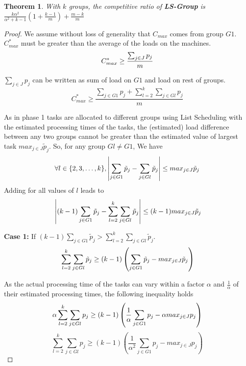 \documentclass[10pt, conference, compsocconf]{IEEEtran}
\newtheorem{theorem}{Theorem}
\begin{document}
\begin{theorem}
  \label{th:strategy3}
  With $k$ groups, the competitive ratio of
  \textbf{LS-Group } is $ \frac{k\alpha^{2}}{\alpha^{2}+k-1} (1+
  {\frac{k-1}{m}} ) + \frac{m-k}{m}$
\end{theorem}
\begin{proof} 
  We assume without loss of generality that $ C_{max}$ comes from
  group $G1$. $C_{max}^{*}$ must be greater than the average of the
  loads on the machines.
  \begin{equation}{\nonumber}
    C_{max}^{*} \geq  \frac{\sum_{j \in J}^{}{{p_{j}}}}{m}
  \end{equation}

  $\sum_{j \in J }{{p_{j}}}$ can be written as sum of load on $G1$ and
  load on rest of groups.
  \begin{equation}\label{eq11}
    C_{max}^{*} \geq  \frac{\sum_{j \in G1 }^{}{{p_{j}}}+ \sum_{l=2}^{k}\sum_{j \in Gl }^{}{{p_{j}}}}{m}
  \end{equation}

  As in phase 1 tasks are allocated to different groups using List
  Scheduling with the estimated processing times of the tasks, the
  (estimated) load difference between any two groups cannot be greater
  than the estimated value of largest task ${max_{j \in J}}{\tilde
    p_{j}}$.  So, for any group $Gl \neq G1$, We have
  \begin{equation}{\nonumber}
\forall l \in \{2, 3, \dots ,k\}, \left |\sum_{j \in G1 }^{}{\tilde p_{j}}- \sum_{j \in Gl }^{}{\tilde p_{j}} \right | \leq {max_{j \in J}}{\tilde p_{j}}
  \end{equation}  
  Adding for all values of $l$ leads to
  \begin{equation}{\nonumber}
    \left | (k-1)\sum_{j \in G1 }^{}{\tilde p_{j}}- \sum_{l=2}^{k}\sum_{j \in Gl }^{}{\tilde p_{j}} \right | \leq (k-1) {max_{j \in J}}{\tilde p_{j}}
  \end{equation}

  \textbf{Case 1:} If $(k-1)\sum_{j \in G1 }^{}{\tilde p_{j}} >
  \sum_{l=2}^{k}\sum_{j \in Gl }^{}{\tilde p_{j}}$.
  \begin{equation}{\nonumber}
    \sum_{l=2}^{k}\sum_{j \in Gl }^{}{\tilde p_{j}} \geq (k-1) \left( \sum_{j \in G1 }^{}{\tilde p_{j}}- {max_{j \in J}}{\tilde p_{j}} \right)
  \end{equation}

  As the actual processing time of the tasks can vary within a factor
  $\alpha$ and $\frac{1}{\alpha}$ of their estimated processing times,
  the following inequality holds
  \begin{equation}{\nonumber}
    \alpha\sum_{l=2}^{k}\sum_{j \in Gl }^{}{{p_{j}}} \geq (k-1) \left( \frac{1}{\alpha}\sum_{j \in G1 }^{}{{p_{j}}}- \alpha {max_{j \in J}}{{p_{j}}} \right)
  \end{equation}
  \begin{equation}\label{eq9}
    \sum_{l=2}^{k}\sum_{j \in Gl }^{}{{p_{j}}} \geq (k-1) \left(\frac{1}{\alpha^{2}}\sum_{j \in G1 }^{}{{p_{j}}}-  {max_{j \in J}}{{p_{j}}} \right)
  \end{equation}


\end{proof}
\end{document}
